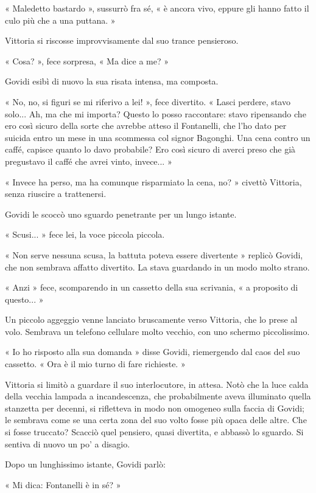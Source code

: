 « Maledetto bastardo », sussurrò fra sé, « è ancora vivo, eppure gli hanno fatto il culo più che a una puttana. »

Vittoria si riscosse improvvisamente dal suo trance pensieroso.

« Cosa? », fece sorpresa, « Ma dice a me? »

Govidi esibì di nuovo la sua risata intensa, ma composta.

« No, no, si figuri se mi riferivo a lei! », fece divertito. « Lasci perdere, stavo solo... Ah, ma che mi importa? Questo lo posso raccontare: stavo ripensando che ero così sicuro della sorte che avrebbe atteso il Fontanelli, che l'ho dato per suicida entro un mese in una scommessa col signor Bagonghi. Una cena contro un caffé, capisce quanto lo davo probabile? Ero così sicuro di averci preso che già pregustavo il caffé che avrei vinto, invece... »

« Invece ha perso, ma ha comunque risparmiato la cena, no? » civettò Vittoria, senza riuscire a trattenersi.

Govidi le scoccò uno sguardo penetrante per un lungo istante.

« Scusi... » fece lei, la voce piccola piccola.

« Non serve nessuna scusa, la battuta poteva essere divertente » replicò Govidi, che non sembrava affatto divertito. La stava guardando in un modo molto strano.

« Anzi » fece, scomparendo in un cassetto della sua scrivania, « a proposito di questo... »

Un piccolo aggeggio venne lanciato bruscamente verso Vittoria, che lo prese al volo. Sembrava un telefono cellulare molto vecchio, con uno schermo piccolissimo.

« Io ho risposto alla sua domanda » disse Govidi, riemergendo dal caos del suo cassetto. « Ora è il mio turno di fare richieste. »

Vittoria si limitò a guardare il suo interlocutore, in attesa. Notò che la luce calda della vecchia lampada a incandescenza, che probabilmente aveva illuminato quella stanzetta per decenni, si rifletteva in modo non omogeneo sulla faccia di Govidi; le sembrava come se una certa zona del suo volto fosse più opaca delle altre. Che si fosse truccato? Scacciò quel pensiero, quasi divertita, e abbassò lo sguardo. Si sentiva di nuovo un po' a disagio.

Dopo un lunghissimo istante, Govidi parlò:

« Mi dica: Fontanelli è in sé? »

